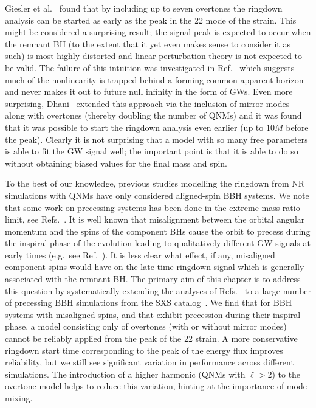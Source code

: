 Giesler et al.~\cite{Giesler:2019uxc} found that by including up to seven overtones the ringdown analysis can be started as early as the peak in the 22 mode of the strain. 
This might be considered a surprising result; the signal peak is expected to occur when the remnant BH (to the extent that it yet even makes sense to consider it as such) is most highly distorted and linear perturbation theory is not expected to be valid. 
The failure of this intuition was investigated in Ref.~\cite{Okounkova:2020vwu} which suggests much of the nonlinearity is trapped behind a forming common apparent horizon and never makes it out to future null infinity in the form of GWs. 
Even more surprising, Dhani~\cite{Dhani:2020nik} extended this approach via the inclusion of mirror modes along with overtones (thereby doubling the number of QNMs) and it was found that it was possible to start the ringdown analysis even earlier (up to $10M$ before the peak). 
Clearly it is not surprising that a model with so many free parameters is able to fit the GW signal well; the important point is that it is able to do so without obtaining biased values for the final mass and spin. 

To the best of our knowledge, previous studies modelling the ringdown from NR simulations with QNMs have only considered aligned-spin BBH systems. 
We note that some work on precessing systems has been done in the extreme mass ratio limit, see Refs.~\cite{Hughes:2019zmt,Lim:2019xrb,Lim:2022veo}.
It is well known that misalignment between the orbital angular momentum and the spins of the component BHs cause the orbit to precess during the inspiral phase of the evolution leading to qualitatively different GW signals at early times (e.g.\ see Ref.~\cite{Apostolatos:1994mx}). 
It is less clear what effect, if any, misaligned component spins would have on the late time ringdown signal which is generally associated with the remnant BH. 
The primary aim of this chapter is to address this question by systematically extending the analyses of Refs.~\cite{Giesler:2019uxc, Dhani:2020nik} to a large number of precessing BBH simulations from the SXS catalog~\cite{Boyle:2019kee}. 
We find that for BBH systems with misaligned spins, and that exhibit precession during their inspiral phase, a model consisting only of overtones (with or without mirror modes) cannot be reliably applied from the peak of the 22 strain. 
A more conservative ringdown start time corresponding to the peak of the energy flux improves reliability, but we still see significant variation in performance across different simulations. 
The introduction of a higher harmonic (QNMs with $\ell > 2$) to the overtone model helps to reduce this variation, hinting at the importance of mode mixing.

